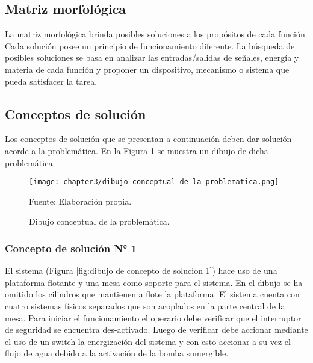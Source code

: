 \subsection{Matriz morfológica}

La matriz morfológica brinda posibles soluciones a los propósitos de cada función. Cada solución posee un principio de funcionamiento diferente. La búsqueda de posibles soluciones se basa en analizar las entradas/salidas de señales, energía y materia de cada función y proponer un dispositivo, mecanismo o sistema que pueda satisfacer la tarea.\cite[p.~181-184]{Pahl2007}


\subsection{Conceptos de solución}

Los conceptos de solución que se presentan a continuación deben dar solución acorde a la problemática. En la Figura \ref{fig:dibujo conceptual de la problematica} se muestra un dibujo de dicha problemática.

\begin{figure}[H]
	\centering
	\texttt{[image: chapter3/dibujo conceptual de la problematica.png]}
	\caption{Dibujo conceptual de la problemática.}
	Fuente: Elaboración propia.
	\label{fig:dibujo conceptual de la problematica}
\end{figure}

\subsubsection{Concepto de solución N° 1}

El sistema (Figura \ref{fig:dibujo de concepto de solucion 1}) hace uso de una plataforma flotante y una mesa como soporte para el sistema. En el dibujo se ha omitido los cilindros que mantienen a flote la plataforma. El sistema cuenta con cuatro sistemas físicos separados que son acoplados en la parte central de la mesa. Para iniciar el funcionamiento el operario debe verificar que el interruptor de seguridad se encuentra des-activado. Luego de verificar debe accionar mediante el uso de un switch la energización del sistema y con esto accionar a su vez el flujo de agua debido a la activación de la bomba sumergible.

